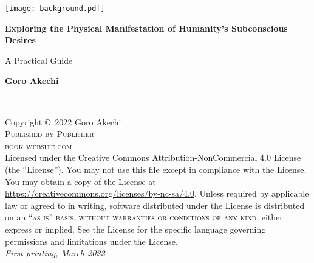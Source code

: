 \documentclass[
	11pt, %
	fleqn, %
	a4paper, %
]{LegrandOrangeBook}
\begin{document}
\titlepage %
{\texttt{[image: background.pdf]}} %
{ %
	\centering\sffamily %
	{\Huge\bfseries Exploring the Physical Manifestation of Humanity's Subconscious Desires\par} %
	\vspace{16pt} %
	{\LARGE A Practical Guide\par} %
	\vspace{24pt} %
	{\huge\bfseries Goro Akechi\par} %
}


\thispagestyle{empty} %

~\vfill %

\noindent Copyright \copyright\ 2022 Goro Akechi\\ %

\noindent \textsc{Published by Publisher}\\ %

\noindent \textsc{\href{https://www.latextemplates.com/template/legrand-orange-book}{book-website.com}}\\ %

\noindent Licensed under the Creative Commons Attribution-NonCommercial 4.0 License (the ``License''). You may not use this file except in compliance with the License. You may obtain a copy of the License at \url{https://creativecommons.org/licenses/by-nc-sa/4.0}. Unless required by applicable law or agreed to in writing, software distributed under the License is distributed on an \textsc{``as is'' basis, without warranties or conditions of any kind}, either express or implied. See the License for the specific language governing permissions and limitations under the License.\\ %

\noindent \textit{First printing, March 2022} %

\end{document}

